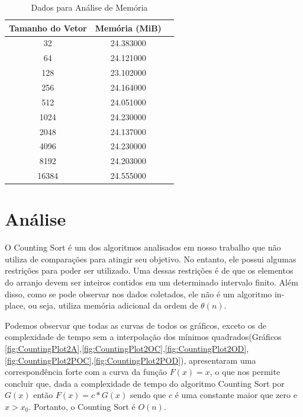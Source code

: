 \documentclass[12pt,a4paper,twoside]{report}
\begin{document}
\begin{table}[h]
  \centering
  \caption{Dados para Análise de Memória \label{tab:memoria}}
  \begin{tabular}{ccc} \\\hline
  \textbf{Tamanho do Vetor} & \textbf{Memória (MiB)} \\\hline
  32                        & 24.383000                  \\\hline
  64                        & 24.121000            \\\hline
  128                       & 23.102000            \\\hline
  256                       & 24.164000            \\\hline
  512                       & 24.051000            \\\hline
  1024                       & 24.230000            \\\hline
  2048                       & 24.137000            \\\hline
  4096                       & 24.230000            \\\hline
  8192                       & 24.203000            \\\hline
  16384                       & 24.555000            \\\hline

  \end{tabular}
\end{table}


\chapter{Análise}

O Counting Sort é um dos algoritmos analisados em nosso trabalho que não utiliza de comparações para atingir seu objetivo. No entanto, ele possui algumas restrições para poder ser utilizado. Uma dessas restrições é de que os elementos do arranjo devem ser inteiros contidos em um determinado intervalo finito. Além disso, como se pode observar nos dados coletados, ele não é um algoritmo in-place, ou seja, utiliza memória adicional da ordem de $\theta (n)$.

Podemos observar que todas as curvas de todos os gráficos, exceto os de complexidade de tempo sem a interpolação dos mínimos quadrados(Gráficos \ref{fig:CountingPlot2A},\ref{fig:CountingPlot2OC},\ref{fig:CountingPlot2OD},\ref{fig:CountingPlot2POC},\ref{fig:CountingPlot2POD}), apresentaram uma correspondência forte com a curva da função $F(x) = x$, o que nos permite concluir que, dada a complexidade de tempo do algoritmo Counting Sort por $G(x)$ então $F(x) = c * G(x)$ sendo que $c$ é uma constante maior que zero e $x > x_0$. Portanto, o Counting Sort é $O(n)$.
\end{document}

